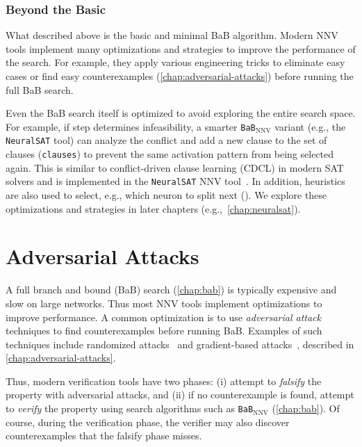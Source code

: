 \documentclass[oneside,11pt,dvipsnames]{book}
\numberwithin{equation}{section}
\theoremstyle{definition}
\theoremstyle{remark}
\newcommand{\tvn}[1]{\iftoggle{usecomment}{{\color{red}{[TVN]: #1}}}{}}
\newcommand{\prooflang}{\texttt{BaB$_{\text{ProofLang}}$}}
\newcommand{\bab}{\texttt{BaB$_{\text{NNV}}$}}
\newcommand{\neuralsat}{\texttt{NeuralSAT}}
\begin{document}
\subsection{Beyond the Basic} What described above is the basic and minimal BaB algorithm. Modern NNV tools implement many optimizations and strategies to improve the performance of the search. For example, they apply various engineering tricks to eliminate easy cases or find easy counterexamples (\autoref{chap:adversarial-attacks}) before running the full BaB search.


Even the BaB search itself is optimized to avoid exploring the entire search space. For example, if \Deduce step determines infeasibility, a smarter \bab{} variant (e.g., the \neuralsat{} tool) can analyze the conflict and add a new clause to the set of clauses (\texttt{clauses}) to prevent the same activation pattern from being selected again. This is similar to conflict-driven clause learning (CDCL) in modern SAT solvers and is implemented in the \neuralsat{} NNV tool~\cite{duong2025neuralsat}. In addition, heuristics are also used to select, e.g., which neuron to split next (\Decide). We explore these optimizations and strategies in later chapters (e.g.,~\autoref{chap:neuralsat}).






\chapter{Adversarial Attacks}\label{chap:adversarial-attacks}


A full branch and bound (BaB) search (\autoref{chap:bab}) is typically expensive and slow on large networks. Thus most NNV tools implement optimizations to improve performance. A common optimization is to use \emph{adversarial attack} techniques to find counterexamples before running BaB.
Examples of such techniques include randomized attacks~\cite{das2021fast} and gradient-based attacks~\cite{madry2017towards}, described in \autoref{chap:adversarial-attacks}.

Thus, modern verification tools have two phases: (i) attempt to \emph{falsify} the property with adversarial attacks, and (ii) if no counterexample is found, attempt to \emph{verify} the property using search algorithms such as \bab{} (\autoref{chap:bab}). Of course, during the verification phase, the verifier may also discover counterexamples that the falsify phase misses.
\end{document}
